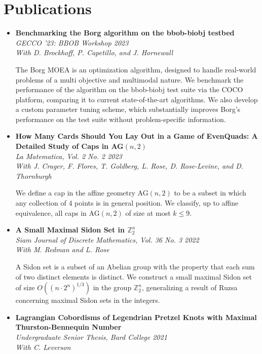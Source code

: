 \documentclass[12pt,letterpaper]{article}
\begin{document}
\section*{Publications}
\begin{itemize}[label=]
    \item
        \textbf{Benchmarking the Borg algorithm on the bbob-biobj testbed}\\
        \textit{GECCO '23: BBOB Workshop \hfill 2023}\\
        \textit{With D. Brockhoff, P. Capetillo, and J. Hornewall}

        The Borg MOEA is an optimization algorithm, designed to handle real-world problems of a multi objective and multimodal nature.
        We benchmark the performance of the algorithm on the bbob-biobj test suite via the COCO platform, comparing it to current state-of-the-art algorithms.
        We also develop a custom parameter tuning scheme, which substantially improves Borg's performance on the test suite without problem-specific information.

    \item
        \textbf{How Many Cards Should You Lay Out in a Game of EvenQuads: A Detailed Study of Caps in AG$(n, 2)$}\\
        \textit{La Matematica, Vol. 2 No. 2 \hfill 2023}\\
        \textit{With J. Crager, F. Flores, T. Goldberg, L. Rose, D. Rose-Levine, and D. Thornburgh}

        We define a cap in the affine geometry AG$(n, 2)$ to be a subset in which any collection of 4 points is in general position.
        We classify, up to affine equivalence, all caps in AG$(n, 2)$ of size at most $k \leq 9$.

    \item
        \textbf{A Small Maximal Sidon Set in $\mathbb{Z}_2^n$}\\
        \textit{Siam Journal of Discrete Mathematics, Vol. 36 No. 3 \hfill 2022}\\
        \textit{With M. Redman and L. Rose}

        A Sidon set is a subset of an Abelian group with the property that each sum of two distinct elements is distinct.
        We construct a small maximal Sidon set of size $O((n \cdot 2^n)^{1/3})$ in the group ${\mathbb{Z}}_2^n$,
        generalizing a result of Ruzsa concerning maximal Sidon sets in the integers.

    \item
        \textbf{Lagrangian Cobordisms of Legendrian Pretzel Knots with Maximal Thurston-Bennequin Number}\\
        \textit{Undergraduate Senior Thesis, Bard College \hfill 2021}\\
        \textit{With C. Leverson}


\end{itemize}
\end{document}
